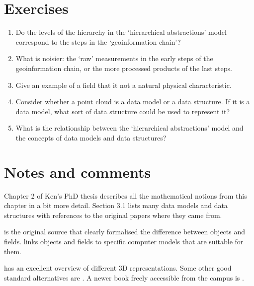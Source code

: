 %
\section{Exercises}

\begin{enumerate}
  \item Do the levels of the hierarchy in the `hierarchical abstractions' model correspond to the steps in the `geoinformation chain'?
	\item What is noisier: the `raw' measurements in the early steps of the geoinformation chain, or the more processed products of the last steps.
	\item Give an example of a field that it not a natural physical characteristic.
	\item Consider whether a point cloud is a data model or a data structure. If it is a data model, what sort of data structure could be used to represent it?
  \item What is the relationship between the `hierarchical abstractions' model and the concepts of data models and data structures?
\end{enumerate}



%
\section{Notes and comments}


Chapter 2 of Ken's PhD thesis describes all the mathematical notions from this chapter in a bit more detail.
Section 3.1 lists many data models and data structures with references to the original papers where they came from.

\citet{Couclelis92} is the original source that clearly formalised the difference between objects and fields.
\citet{Goodchild92} links objects and fields to specific computer models that are suitable for them.

\citet{Mantyla88} has an excellent overview of different 3D representations.
Some other good standard alternatives are \citet{Requicha80,Hoffmann92,Foley95}.
A newer book freely accessible from the campus is \citet{Salomon11}.

